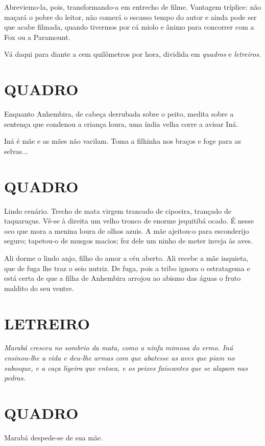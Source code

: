 Abreviemo-la, pois, transformando-a em entrecho de filme. Vantagem
tríplice: não maçará o pobre do leitor, não comerá o escasso tempo do
autor e ainda pode ser que acabe filmada, quando tivermos por cá miolo e
ânimo para concorrer com a Fox ou a Paramount.

Vá daqui para diante a cem quilômetros por hora, dividida em
\emph{quadros} e \emph{letreiros}.

\section{QUADRO}

Enquanto Anhembira, de cabeça derrubada sobre o peito, medita sobre a
sentença que condenou a criança loura, uma índia velha corre a avisar
Iná.

Iná é mãe e as mães não vacilam. Toma a filhinha nos braços e foge para
as selvas...

\section{QUADRO}

Lindo cenário. Trecho de mata virgem trancado de cipoeira, trançado de
taquaruçus. Vê-se à direita um velho tronco de enorme jequitibá ocado. É
nesse oco que mora a menina loura de olhos azuis. A mãe ajeitou-o para
esconderijo seguro; tapetou-o de musgos macios; fez dele um ninho de
meter inveja às aves.

Ali dorme o lindo anjo, filho do amor a céu aberto. Ali recebe a mãe
inquieta, que de fuga lhe traz o seio nutriz. De fuga, pois a tribo
ignora o estratagema e está certa de que a filha de Anhembira arrojou ao
abismo das águas o fruto maldito do seu ventre.

\section{LETREIRO}

\emph{Marabá cresceu no sombrio da mata, como a ninfa mimosa do ermo.
Iná ensinou-lhe a vida e deu-lhe armas com que abatesse as aves que piam
no subosque, e a caça ligeira que entoca, e os peixes faiscantes que se
alapam nas pedras.}

\section{QUADRO}

Marabá despede-se de sua mãe.


